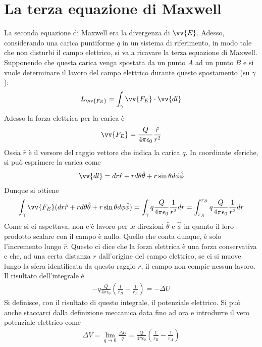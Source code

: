 \documentclass[a4paper, oneside]{article}
\begin{document}
\section{La terza equazione di Maxwell}
La seconda equazione di Maxwell era la divergenza di $\vv{E}$. Adesso, 
considerando una carica puntiforme $q$ in un sistema di riferimento,
in modo tale che non disturbi il campo elettrico,
si va a ricavare la terza equazione di Maxwell.  Supponendo 
che questa carica venga spostata da un punto $A$ ad un punto 
$B$ e si vuole determinare il lavoro del campo elettrico durante questo 
spostamento (su $\gamma$):
\begin{gather*}
    L_{\vv{F_E} } = \int_{\gamma} \vv{F_E} \cdot \vv{dl}   
\end{gather*}
Adesso la forza elettrica per la carica è
\begin{gather*}
    \vv{F_E} = \frac{Q}{4\pi\epsilon_0} \frac{\hat{r} }{r^{2}} 
\end{gather*}
Ossia $\hat{r}$ è il versore del raggio vettore che indica la carica $q$.
In coordinate sferiche, si può esprimere la carica come 
\begin{gather*}
    \vv{dl}  = dr\hat{r} + rd\theta \hat{\theta} + r\sin\theta d\phi \hat{\phi}   
\end{gather*} 
Dunque si ottiene 
\begin{gather*}
    \int_{\gamma} \vv{F_E}(dr\hat{r} + rd\theta \hat{\theta} + r\sin\theta d\phi \hat{\phi})    = \int_{\gamma} q\frac{Q}{4\pi\epsilon_0} \frac{1}{r^{2}}dr = \int_{r_A}^{r_B} q\frac{Q}{4\pi\epsilon_0} \frac{1}{r^{2}}dr 
\end{gather*}
Come si ci aspettava, non c'è lavoro per le direzioni $\hat{\theta}$ e $\hat{\phi}  $
in quanto il loro prodotto scalare con il campo è nullo. Quello che conta dunque, 
è solo l'incremento lungo $\hat{r}$. Questo ci dice che 
la forza elettrica è una forza conservativa e che, ad una certa distanza $r$ 
dall'origine del campo elettrico, se ci si muove lungo la sfera identificata da
questo raggio $r$, il campo non compie nessun lavoro. Il risultato dell'integrale è 
\begin{gather*}
    -q\frac{Q}{4\pi\epsilon_0} \left(\frac{1}{r_B} - \frac{1}{r_A}\right) = -\Delta U
\end{gather*}
Si definisce, con il risultato di questo integrale, il potenziale elettrico. Si può 
anche staccarci dalla definizione meccanica data fino ad ora e introdurre il vero potenziale 
elettrico come
\begin{align}
    \Delta V = \lim_{q  \to 0} \frac{\Delta U}{q} = \frac{Q}{4\pi\epsilon_0} \left(\frac{1}{r_B} - \frac{1}{r_A}\right)
\end{align}
\end{document}
